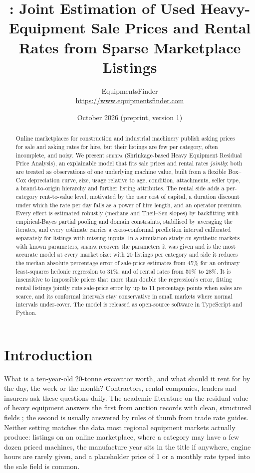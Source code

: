 \documentclass[11pt]{article}
\title{\sherpa: Joint Estimation of Used Heavy-Equipment Sale Prices and Rental Rates from Sparse Marketplace Listings}
\author{EquipmentsFinder\\
\small\url{https://www.equipmentsfinder.com}}
\date{October 2026 \quad (preprint, version 1)}
\newcommand{\sherpa}{\textsc{sherpa}}
\begin{document}
\maketitle

\begin{abstract}
Online marketplaces for construction and industrial machinery publish asking prices for sale and
asking rates for hire, but their listings are few per category, often incomplete, and noisy. We
present \sherpa{} (Shrinkage-based Heavy Equipment Residual Price Analysis), an explainable model
that fits sale prices and rental rates \emph{jointly}: both are treated as observations of one
underlying machine value, built from a flexible Box--Cox depreciation curve, size, usage relative to
age, condition, attachments, seller type, a brand-to-origin hierarchy and further listing
attributes. The rental side adds a per-category rent-to-value level, motivated by the user cost of
capital, a duration discount under which the rate per day falls as a power of hire length, and an
operator premium. Every effect is estimated robustly (medians and Theil--Sen slopes) by backfitting
with empirical-Bayes partial pooling and domain constraints, stabilised by averaging the iterates,
and every estimate carries a cross-conformal prediction interval calibrated separately for listings
with missing inputs. In a simulation study on synthetic markets with known parameters, \sherpa{}
recovers the parameters it was given and is the most accurate model at every market size: with 20
listings per category and side it reduces the median absolute percentage error of sale-price
estimates from 45\% for an ordinary least-squares hedonic regression to 31\%, and of rental rates
from 50\% to 28\%. It is insensitive to impossible prices that more than double the regression's
error, fitting rental listings jointly cuts sale-price error by up to 11 percentage points when
sales are scarce, and its conformal intervals stay conservative in small markets where normal
intervals under-cover. The model is released as open-source software in TypeScript and Python.
\end{abstract}

\section{Introduction}

What is a ten-year-old 20-tonne excavator worth, and what should it rent for by the day, the week
or the month? Contractors, rental companies, lenders and insurers ask these questions daily. The
academic literature on the residual value of heavy equipment answers the first from auction
records with clean, structured fields \citep{lucko2006,fan2008,milosevic2021}; the second is
usually answered by rules of thumb from trade rate guides. Neither setting matches the data most
regional equipment markets actually produce: listings on an online marketplace, where a category
may have a few dozen priced machines, the manufacture year sits in the title if anywhere, engine
hours are rarely given, and a placeholder price of 1 or a monthly rate typed into the sale field is
common.
\end{document}
